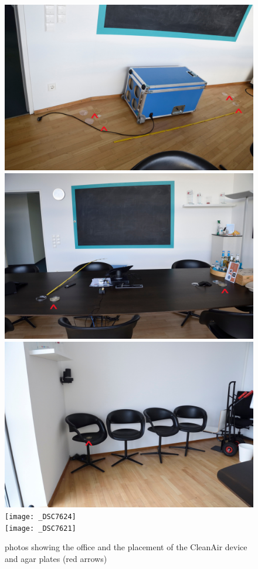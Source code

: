 \documentclass[hyperref]{labbook}
\begin{document}
\begin{figure}[H]
\includegraphics[scale=0.05]{_DSC7617}\hfill
\includegraphics[scale=0.05]{_DSC7622}\\
\includegraphics[scale=0.05]{_DSC7623}\hfill
\texttt{[image: \_DSC7624]}\\
\texttt{[image: \_DSC7621]}\\
\caption{photos showing the office and the placement of the CleanAir device and agar plates (red arrows)}
\end{figure}
\end{document}
